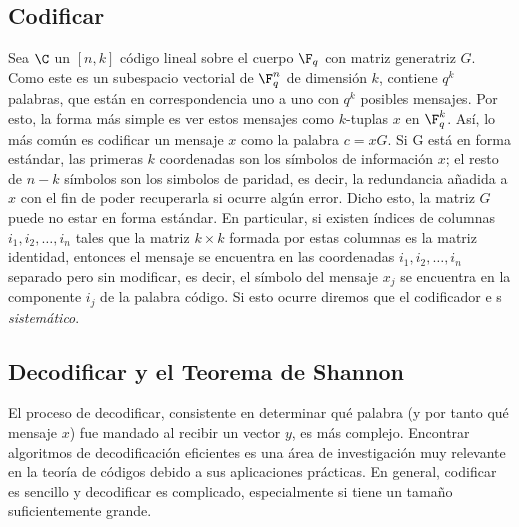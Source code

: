 \subsection{Codificar}%
Sea \(\C\) un \([n,k]\) código lineal sobre el cuerpo \(\F_q\) con matriz generatriz \(G\). Como este es un subespacio vectorial de \(\F_q^n\) de dimensión \(k\), contiene \(q^k\) palabras, que están en correspondencia uno a uno con \(q^k\) posibles mensajes. Por esto, la forma más simple es ver estos mensajes como \(k\)-tuplas \(x\) en \(\F_q^k\). Así, lo más común es codificar un mensaje \(x\) como la palabra \(c = xG\). Si G está en forma estándar, las primeras \(k\) coordenadas son los símbolos de información \(x\); el resto de \(n-k\) símbolos son los simbolos de paridad, es decir, la redundancia añadida a \(x\) con el fin de poder recuperarla si ocurre algún error. Dicho esto, la matriz \(G\) puede no estar en forma estándar. En particular, si existen índices de columnas \(i_1, i_2, \dots, i_n \) tales que la matriz \(k \times k\) formada por estas columnas es la matriz identidad, entonces el mensaje se encuentra en las coordenadas \(i_1, i_2, \dots, i_n \) separado pero sin modificar, es decir, el símbolo del mensaje \(x_j\) se encuentra en la componente \(i_j\) de la palabra código. Si esto ocurre diremos que el codificador e s \textit{sistemático}.

\subsection{Decodificar y el Teorema de Shannon}%
\label{sub:decodificar_y_el_teorema_de_shannon}

El proceso de decodificar, consistente en determinar qué palabra (y por tanto qué mensaje \(x\)) fue mandado al recibir un vector \(y\), es más complejo. Encontrar algoritmos de decodificación eficientes es una área de investigación muy relevante en la teoría de códigos debido a sus aplicaciones prácticas. En general, codificar es sencillo y decodificar es complicado, especialmente si tiene un tamaño suficientemente grande.
